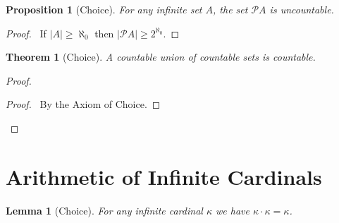 \documentclass{report}
\let\qed\relax
\newtheorem{lemma}[axiom]{Lemma}
\newtheorem{proposition}[axiom]{Proposition}
\newtheorem{theorem}[axiom]{Theorem}
\theoremstyle{definition}
\begin{document}
    \begin{proposition}[Choice]
        For any infinite set $A$, the set $\mathcal{P} A$ is uncountable.
    \end{proposition}

    \begin{proof}
        \pf\ If $|A| \geq \aleph_0$ then $|\mathcal{P} A| \geq 2^{\aleph_0}$. \qed
    \end{proof}

    \begin{theorem}[Choice]
        A countable union of countable sets is countable.
    \end{theorem}

    \begin{proof}
        \pf
        \begin{proof}
            \pf\ By the Axiom of Choice.
        \end{proof}
        \qed
    \end{proof}
    
    \section{Arithmetic of Infinite Cardinals}

    \begin{lemma}[Choice]
        For any infinite cardinal $\kappa$ we have $\kappa \cdot \kappa = \kappa$.
    \end{lemma}
\end{document}
